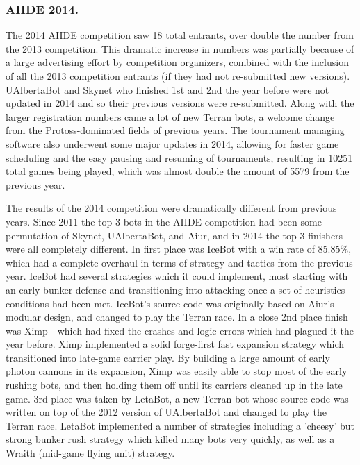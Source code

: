 \documentclass{llncs}
\begin{document}
\subsubsection{AIIDE 2014.}

The 2014 AIIDE competition saw 18 total entrants, over double the number from the 2013 competition. This dramatic increase in numbers was partially because of a large advertising effort by competition organizers, combined with the inclusion of all the 2013 competition entrants (if they had not re-submitted new versions). UAlbertaBot and Skynet who finished 1st and 2nd the year before were not updated in 2014 and so their previous versions were re-submitted. Along with the larger registration numbers came a lot of new Terran bots, a welcome change from the Protoss-dominated fields of previous years. The tournament managing software also underwent some major updates in 2014, allowing for faster game scheduling and the easy pausing and resuming of tournaments, resulting in 10251 total games being played, which was almost double the amount of 5579 from the previous year.

The results of the 2014 competition were dramatically different from previous years. Since 2011 the top 3 bots in the AIIDE competition had been some permutation of Skynet, UAlbertaBot, and Aiur, and in 2014 the top 3 finishers were all completely different. In first place was IceBot with a win rate of 85.85\%, which had a complete overhaul in terms of strategy and tactics from the previous year. IceBot had several strategies which it could implement, most starting with an early bunker defense and transitioning into attacking once a set of heuristics conditions had been met. IceBot's source code was originally based on Aiur's modular design, and changed to play the Terran race. In a close 2nd place finish was Ximp - which had fixed the crashes and logic errors which had plagued it the year before. Ximp implemented a solid forge-first fast expansion strategy which transitioned into late-game carrier play. By building a large amount of early photon cannons in its expansion, Ximp was easily able to stop most of the early rushing bots, and then holding them off until its carriers cleaned up in the late game. 3rd place was taken by LetaBot, a new Terran bot whose source code was written on top of the 2012 version of UAlbertaBot and changed to play the Terran race. LetaBot implemented a number of strategies including a 'cheesy' but strong bunker rush strategy which killed many bots very quickly, as well as a Wraith (mid-game flying unit) strategy. 
\end{document}
